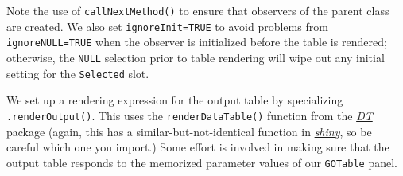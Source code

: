 \documentclass[
]{book}
\newenvironment{Shaded}{\begin{snugshade}}{\end{snugshade}}
\newcommand{\CommentTok}[1]{\textcolor[rgb]{0.56,0.35,0.01}{\textit{#1}}}
\newcommand{\ControlFlowTok}[1]{\textcolor[rgb]{0.13,0.29,0.53}{\textbf{#1}}}
\newcommand{\KeywordTok}[1]{\textcolor[rgb]{0.13,0.29,0.53}{\textbf{#1}}}
\newcommand{\NormalTok}[1]{#1}
\newcommand{\OperatorTok}[1]{\textcolor[rgb]{0.81,0.36,0.00}{\textbf{#1}}}
\newcommand{\OtherTok}[1]{\textcolor[rgb]{0.56,0.35,0.01}{#1}}
\newcommand{\StringTok}[1]{\textcolor[rgb]{0.31,0.60,0.02}{#1}}
\begin{document}
\begin{Shaded}
\end{Shaded}

Note the use of \texttt{callNextMethod()} to ensure that observers of the parent class are created.
We also set \texttt{ignoreInit=TRUE} to avoid problems from \texttt{ignoreNULL=TRUE} when the observer is initialized before the table is rendered; otherwise, the \texttt{NULL} selection prior to table rendering will wipe out any initial setting for the \texttt{Selected} slot.

We set up a rendering expression for the output table by specializing \texttt{.renderOutput()}.
This uses the \texttt{renderDataTable()} function from the \emph{\href{https://CRAN.R-project.org/package=DT}{DT}} package
(again, this has a similar-but-not-identical function in \emph{\href{https://CRAN.R-project.org/package=shiny}{shiny}}, so be careful which one you import.)
Some effort is involved in making sure that the output table responds to the memorized parameter values of our \texttt{GOTable} panel.
\end{document}
